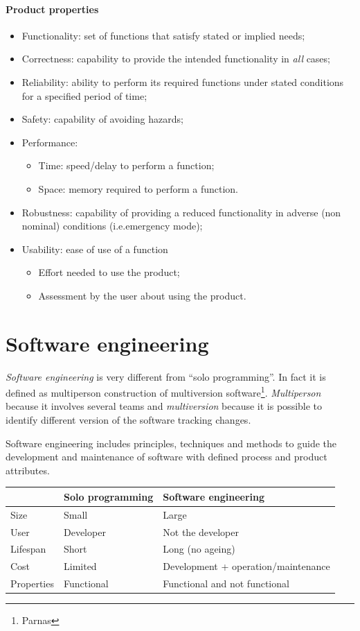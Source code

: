 \paragraph{Product properties}
\begin{itemize}
\item Functionality: set of functions that satisfy stated or implied needs;
\item Correctness: capability to provide the intended functionality in \textit{all} cases;
\item Reliability: ability to perform its required functions under stated conditions for a specified period of time;
\item Safety: capability of avoiding hazards;\item Performance:
\begin{itemize}
\item Time: speed/delay to perform a function;
\item Space: memory required to perform a function.
\end{itemize}
\item Robustness: capability of providing a reduced functionality in adverse (non nominal) conditions (i.e.\@ emergency mode);
\item Usability: ease of use of a function \begin{itemize}
\item Effort needed to use the product;
\item Assessment by the user about using the product.
\end{itemize}
\end{itemize}

\section{Software engineering}
\emph{Software engineering} is very different from ``solo programming''. In fact it is defined as multiperson construction of multiversion software\footnote{Parnas}. \emph{Multiperson} because it involves several teams and \emph{multiversion} because it is possible to identify different version of the software tracking changes.

Software engineering includes principles, techniques and methods to guide the development and maintenance of software with defined process and product attributes.

\begin{center}
\begin{tabular}{l|p{}l}
\toprule
&	Solo programming	&	Software engineering	\\
\midrule
Size	&	Small	&	Large \\
User	&	Developer	&	Not the developer	\\
Lifespan	&	Short	&	Long (no ageing) \\
Cost	&	Limited	&	Development + operation/maintenance \\
Properties	&	Functional	& Functional and not functional	\\
\bottomrule
\end{tabular}
\end{center}

